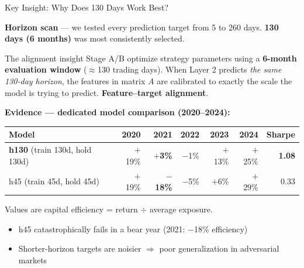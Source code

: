 \documentclass[aspectratio=169]{beamer}
\begin{document}
\begin{frame}{Key Insight: Why Does 130 Days Work Best?}

  \textbf{Horizon scan} --- we tested every prediction target from 5 to 260 days.
  \textbf{130 days (6 months)} was most consistently selected.

  \vspace{0.4em}
  \begin{block}{The alignment insight}
    Stage A/B optimize strategy parameters using a \textbf{6-month evaluation window}
    ($\approx$130 trading days).
    When Layer 2 predicts \emph{the same 130-day horizon}, the features in matrix $A$
    are calibrated to exactly the scale the model is trying to predict.
    \textbf{Feature--target alignment}.
  \end{block}

  \vspace{0.4em}
  \textbf{Evidence --- dedicated model comparison (2020--2024):}

  \vspace{0.2em}
  \begin{tabular}{lrrrrrr}
    \toprule
    Model & 2020 & 2021 & 2022 & 2023 & 2024 & Sharpe \\
    \midrule
    \textbf{h130} (train 130d, hold 130d)
      & $+$19\% & \textbf{$+$3\%} & $-$1\% & $+$13\% & $+$25\% & \textbf{1.08} \\
    h45  (train 45d, hold 45d)
      & $+$19\% & \textcolor{qRed}{\textbf{$-$18\%}} & $-$5\% & $+$6\% & $+$29\% & \textcolor{qRed}{0.33} \\
    \bottomrule
  \end{tabular}

  \vspace{0.3em}
  {\footnotesize Values are capital efficiency = return $\div$ average exposure.}

  \vspace{0.3em}
  \begin{itemize}
    \item h45 catastrophically fails in a bear year (2021: $-$18\% efficiency)
    \item Shorter-horizon targets are noisier $\Rightarrow$ poor generalization in adversarial markets
  \end{itemize}

\end{frame}
\end{document}
